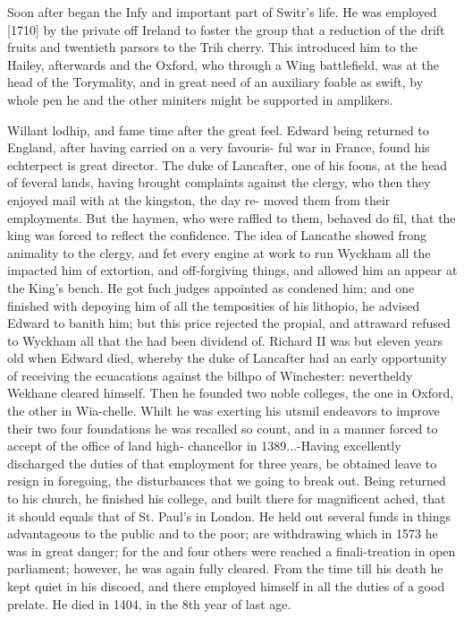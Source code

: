 \documentclass{article}
\begin{document}
Soon after began the Infy and important part of Switr’s life. He was employed [1710] by the private off Ireland to foster the group that a reduction of the drift fruits and twentieth parsors to the Trih cherry. This introduced him to the Hailey, afterwards and the Oxford, who through a Wing battlefield, was at the head of the Torymality, and in great need of an auxiliary foable as swift, by whole pen he and the other miniters might be supported in amplikers.

Willant lodhip, and fame time after the great feel. Edward being returned to England, after having carried on a very favouris- ful war in France, found his echterpect is great director. The duke of Lancafter, one of his foons, at the head of feveral lands, having brought complaints against the clergy, who then they enjoyed mail with at the kingston, the day re- moved them from their employments. But the haymen, who were raffled to them, behaved do fil, that the king was forced to reflect the confidence. The idea of Lancathe showed frong animality to the clergy, and fet every engine at work to run Wyckham all the impacted him of extortion, and off-forgiving things, and allowed him an appear at the King's bench. He got fuch judges appointed as condened him; and one finished with depoying him of all the temposities of his lithopio, he advised Edward to banith him; but this price rejected the propial, and attraward refused to Wyckham all that the had been dividend of. Richard II was but eleven years old when Edward died, whereby the duke of Lancafter had an early opportunity of receiving the ecuacations against the bilhpo of Winchester: nevertheldy Wekhane cleared himself. Then he founded two noble colleges, the one in Oxford, the other in Wia-chelle. Whilt he was exerting his utsmil endeavors to improve their two four foundations he was recalled so count, and in a manner forced to accept of the office of land high- chancellor in 1389...-Having excellently discharged the duties of that employment for three years, be obtained leave to resign in foregoing, the disturbances that we going to break out. Being returned to his church, he finished his college, and built there for magnificent ached, that it should equals that of St. Paul’s in London. He held out several funds in things advantageous to the public and to the poor; are withdrawing which in 1573 he was in great danger; for the and four others were reached a finali-treation in open parliament; however, he was again fully cleared. From the time till his death he kept quiet in his discoed, and there employed himself in all the duties of a good prelate. He died in 1404, in the 8th year of last age.
\end{document}
